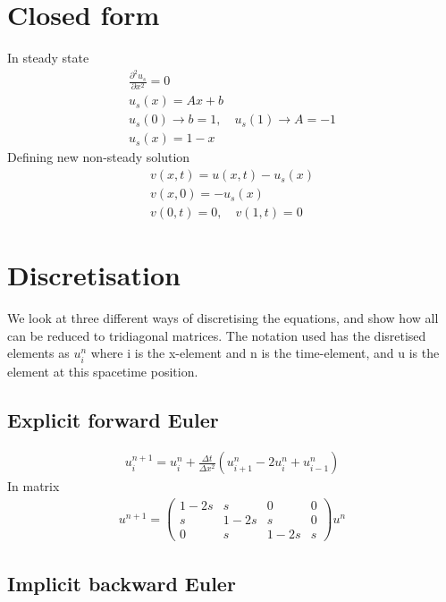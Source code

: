 \documentclass[11pt,a4paper,draft]{article}
\numberwithin{equation}{section}
\begin{document}
\section{Closed form}
In steady state
\begin{gather}
\frac{\partial^2 u_s}{\partial x^2} = 0\\
u_s(x) = Ax + b\\
u_s(0) \to b = 1, \quad
u_s(1) \to A = -1\\
u_s(x) = 1-x
\end{gather}
Defining new non-steady solution
\begin{gather}
v(x,t) = u(x,t) - u_s(x)\\
v(x,0) = -u_s(x)\\
v(0,t) = 0, \quad v(1, t) = 0
\end{gather}


\section{Discretisation}

We look at three different ways of discretising the equations, and 
show how all can be reduced to tridiagonal matrices. The notation used 
has the disretised elements as $u_i^n$ where i is the x-element and 
n is the time-element, and u is the element at this spacetime position.

\subsection{Explicit forward Euler}

\begin{gather}
u_i^{n+1} = u_i^n + \frac{\Delta t}{\Delta x^2}\left(
u_{i+1}^n - 2u_i^n + u_{i-1}^n
\right)
\end{gather}
In matrix
\begin{gather}
u^{n+1} = 
\begin{pmatrix}
1 - 2s & s & 0 & 0\\
s & 1 - 2s & s & 0\\
0 & s & 1-2s & s
\end{pmatrix}u^n
\end{gather}



\subsection{Implicit backward Euler}
\end{document}
